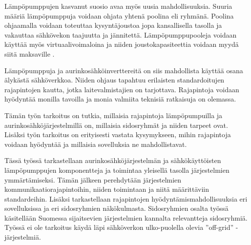 Lämpöpumppujen kasvanut suosio avaa myös uusia mahdollisuuksia. Suuria määriä lämpöpumppuja voidaan ohjata yhtenä poolina eli ryhmänä. Poolina ohjaamalla voidaan toteuttaa kysyntäjoustoa jopa kansallisella tasolla ja vakauttaa sähkövekon taajuutta ja jännitettä. Lämpöpumppupooleja voidaan käyttää myös virtuaalivoimaloina ja niiden joustokapasiteettia voidaan myydä siitä maksaville \parencite{ShenJiangLi, fischerTriebelSelinger}.

Lämpöpumppuja ja aurinkosähköinverttereitä on siis mahdollista käyttää osana älykästä sähköverkkoa. Niiden ohjaus tapahtuu erilaisten standardoitujen rajapintojen kautta, jotka laitevalmistajien on tarjottava. Rajapintoja voidaan hyödyntää monilla tavoilla ja monia valmiita teknisiä ratkaisuja on olemassa.

Tämän työn tarkoitus on tutkia, millaisia rajapintoja lämpöpumpuilla ja aurinkosähköjärjestelmillä on, millaisia sidosryhmät ja niiden tarpeet ovat. Lisäksi työn tarkoitus on erityisesti vastata kysymykseen, mihin rajapintoja voidaan hyödyntää ja millaisia sovelluksia ne mahdollistavat.

Tässä työssä tarkastellaan aurinkosähköjärjestelmän ja sähkökäyttöisten lämpöpumppujen komponentteja ja toimintaa yleisellä tasolla järjestelmien ymmärtämiseksi. Tämän jälkeen perehdytään järjestelmien kommunikaatiorajapintoihin, niiden toimintaan ja niitä määrittäviin standardeihin. Lisäksi tarkastellaan rajapintojen hyödyntämismahdollisuuksia eri sovelluksissa ja eri sidosryhmien näkökulmasta. Sidosryhmien osalta työssä käsitellään Suomessa sijaitsevien järjestelmien kannalta relevantteja sidosryhmiä. Työssä ei ole tarkoitus käydä läpi sähköverkon ulko-puolella olevia ”off-grid” -järjestelmiä.
